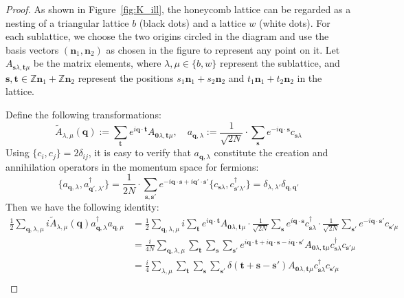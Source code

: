 \begin{proof}
As shown in Figure~\ref{fig:K_ill}, the honeycomb lattice can be regarded as a nesting of a triangular lattice $b$ (black dots) and a lattice $w$ (white dots). For each sublattice, we choose the two origins circled in the diagram and use the basis vectors $(\mathbf{n}_1, \mathbf{n}_2)$ as chosen in the figure to represent any point on it.
Let $A_{\mathbf s\lambda, \mathbf t\mu}$ be the matrix elements, where $\lambda, \mu \in\{b,w\}$ represent the sublattice, and $\mathbf s,\mathbf t \in \mathbb{Z}\mathbf{n}_1 +\mathbb{Z}\mathbf{n}_2$ represent the positions $s_1 \mathbf{n}_1 + s_2 \mathbf{n}_2$ and $t_1 \mathbf{n}_1 + t_2 \mathbf{n}_2$ in the lattice.

Define the following transformations:
$$
\tilde A_{\lambda,\mu}(\mathbf{q}):= \sum_{\mathbf t} e^{i \mathbf q \cdot \mathbf t}A_{\mathbf0\lambda, \mathbf t\mu}, \quad a_{\mathbf q, \lambda}:= \frac{1}{\sqrt{2N}}\cdot \sum_{\mathbf s} e^{-i\mathbf{q}\cdot \mathbf{s}} c_{\mathbf{s}\lambda}
$$
Using $\{c_i, c_j\} = 2 \delta_{ij}$, it is easy to verify that $a_{\mathbf q, \lambda}$ constitute the creation and annihilation operators in the momentum space for fermions:
$$
\{a_{\mathbf q, \lambda},a_{\mathbf q', \lambda'}^\dagger\} = \frac{1}{2N}\cdot \sum_{\mathbf s,\mathbf s'} e^{-i\mathbf{q}\cdot \mathbf{s}+ i\mathbf{q}'\cdot \mathbf{s}'} \{c_{\mathbf{s}\lambda},c_{\mathbf{s}'\lambda'}^\dagger\}= \delta_{\lambda, \lambda'}\delta_{\mathbf{q}, \mathbf{q}'}
$$
Then we have the following identity:
\begin{align*}
\frac{1}{2}\sum_{\mathbf{q},\lambda,\mu}i\tilde A_{\lambda,\mu}(\mathbf{q}) a^\dagger_{\mathbf q, \lambda}a_{\mathbf q, \mu}
&= \frac{1}{2}\sum_{\mathbf{q},\lambda,\mu}i\sum_{\mathbf t} e^{i \mathbf q \cdot \mathbf t}A_{\mathbf0\lambda, \mathbf t\mu} \cdot \frac{1}{\sqrt{2N}} \sum_{\mathbf s} e^{i\mathbf{q}\cdot \mathbf{s}} c_{\mathbf{s}\lambda}^\dagger \cdot \frac{1}{\sqrt{2N}} \sum_{\mathbf s'} e^{-i\mathbf{q}\cdot \mathbf{s}'} c_{\mathbf{s}'\mu} \\
&= \frac{i}{4N}\sum_{\mathbf{q},\lambda,\mu}\sum_{\mathbf t} \sum_{\mathbf s} \sum_{\mathbf s'} e^{i \mathbf q \cdot \mathbf t+i\mathbf{q}\cdot \mathbf{s}-i\mathbf{q}\cdot \mathbf{s}'}A_{\mathbf0\lambda, \mathbf t\mu} c_{\mathbf{s}\lambda}^\dagger c_{\mathbf{s}'\mu} \\
&= \frac{i}{4}\sum_{\lambda,\mu}\sum_{\mathbf t} \sum_{\mathbf s} \sum_{\mathbf s'} \delta(\mathbf t+\mathbf{s}-\mathbf{s}')A_{\mathbf0\lambda, \mathbf t\mu} c_{\mathbf{s}\lambda}^\dagger c_{\mathbf{s}'\mu} \\

\end{align*}
\end{proof}
